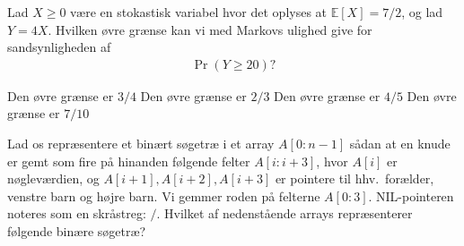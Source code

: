 Lad \(X\geq 0\) være en stokastisk variabel hvor det oplyses at $\mathbb E[X]=7/2$, og lad $Y=4X$.
Hvilken øvre grænse kan vi med Markovs ulighed give for sandsynligheden af
\begin{align*}
  \Pr(Y \geq 20 )?
\end{align*}
\etsvar

\mulighederstart
\svar Den øvre grænse er \(3/4\)
\svar Den øvre grænse er \(2/3\)
\svar Den øvre grænse er \(4/5\)
\svar Den øvre grænse er \(7/10\) \korrekt
\mulighederslut

\sideskift

Lad os repræsentere et binært søgetræ i et array \(A[0:n-1]\) sådan at en knude er gemt
som fire på hinanden følgende felter \(A[i:i+3]\), hvor \(A[i]\) er nøgleværdien,
og \(A[i+1], A[i+2], A[i+3]\) er pointere til hhv.\ forælder, venstre barn og højre barn.
Vi gemmer roden på felterne \(A[0:3]\).
NIL-pointeren noteres som en skråstreg: \(/\).
Hvilket af nedenstående arrays repræsenterer følgende binære søgetræ?

\begin{center}
\end{center}
\etsvar

